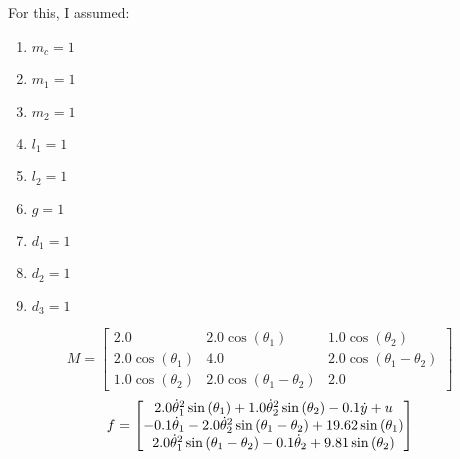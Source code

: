 For this, I assumed: 
\begin{enumerate}\item $m_c = 1$
\item $m_1 = 1$
\item $m_2 = 1$
\item $l_1 = 1$
\item $l_2 = 1$
\item $g = 1$
\item $d_1 = 1$
\item $d_2 = 1$
\item $d_3 = 1$
\end{enumerate}
\begin{equation}
M = \left[\begin{matrix}2.0 & 2.0 \cos{\left(\theta_{1} \right)} & 1.0 \cos{\left(\theta_{2} \right)}\\
2.0 \cos{\left(\theta_{1} \right)} & 4.0 & 2.0 \cos{\left(\theta_{1} - \theta_{2} \right)}\\
1.0 \cos{\left(\theta_{2} \right)} & 2.0 \cos{\left(\theta_{1} - \theta_{2} \right)} & 2.0\end{matrix}\right]
\end{equation}
\begin{equation}
f = \left[\begin{matrix}2.0 \dot\theta_{1}^{2} \sin{\left(\theta_{1} \right)} + 1.0 \dot\theta_{2}^{2} \sin{\left(\theta_{2} \right)} - 0.1 \dot y + u\\
- 0.1 \dot\theta_{1} - 2.0 \dot\theta_{2}^{2} \sin{\left(\theta_{1} - \theta_{2} \right)} + 19.62 \sin{\left(\theta_{1} \right)}\\
2.0 \dot\theta_{1}^{2} \sin{\left(\theta_{1} - \theta_{2} \right)} - 0.1 \dot\theta_{2} + 9.81 \sin{\left(\theta_{2} \right)}\end{matrix}\right]
\end{equation}
